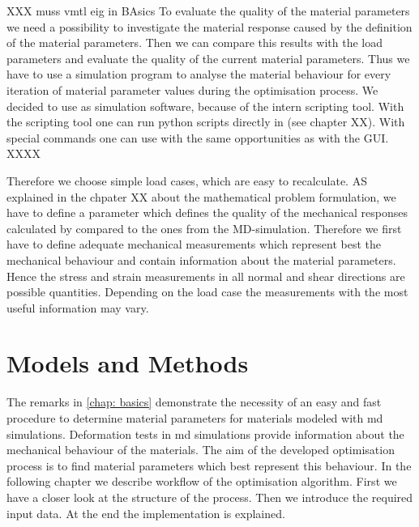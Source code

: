 
XXX muss vmtl eig in BAsics
To evaluate the quality of the material parameters we need a possibility to investigate the material response caused by the definition of the material parameters. Then we can compare this results with the load parameters and evaluate the quality of the current material parameters. Thus we have to use a simulation program to analyse the material behaviour for every iteration of material parameter values during the optimisation process. We decided to use  as simulation software, because of the intern scripting tool. With the  scripting tool one can run python scripts directly in  (see chapter XX). With special  commands one can use  with the same opportunities as with the GUI. 
XXXX

Therefore we choose simple load cases, which are easy to recalculate. AS explained in the chpater XX about the mathematical problem formulation, we have to define a parameter which defines the quality of the mechanical responses calculated by  compared to the ones from the MD-simulation. Therefore we first have to define adequate mechanical measurements which represent best the mechanical behaviour and contain information about the material parameters. Hence the stress and strain measurements in all normal and shear directions are possible quantities. Depending on the load case the measurements with the most useful information may vary.



\chapter{Models and Methods} \label{chap: modelsAndMethods}

The remarks in \autoref{chap: basics} demonstrate the necessity of an easy and fast procedure to determine material parameters for materials modeled with \acrshort{md} simulations. Deformation tests in \acrshort{md} simulations provide information about the mechanical behaviour of the materials. The aim of the developed optimisation process is to find material parameters which best represent this behaviour.
In the following chapter we describe workflow of the optimisation algorithm. First we have a closer look at the structure of the process. Then we introduce the required input data. At the end the implementation is explained. \\

